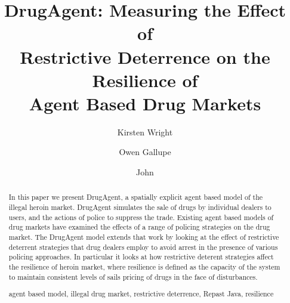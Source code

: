 \documentclass[runningheads,a4paper]{llncs}
\newcommand{\keywords}[1]{\par\addvspace\baselineskip
\noindent\keywordname\enspace\ignorespaces#1}
\begin{document}
\mainmatter  %

\title{DrugAgent: Measuring the Effect of \\Restrictive Deterrence on the Resilience of \\Agent Based Drug Markets}
%
%
\author{Kirsten Wright %
\and Owen Gallupe \and John}
%




\maketitle


\begin{abstract}

In this paper we present DrugAgent, a spatially explicit agent based model of the illegal heroin market. DrugAgent simulates the sale of drugs by individual dealers to users, and the actions of police to suppress the trade. Existing agent based models of drug markets have examined the effects of a range of policing strategies on the drug market. The DrugAgent model extends that work by looking at the effect of restrictive deterrent strategies that drug dealers employ to avoid arrest in the presence of various policing approaches. In particular it looks at how restrictive deterent strategies affect the resilience of heroin market, where resilience is defined as the capacity of the system to maintain consistent levels of sails pricing of drugs in the face of disturbances.


\keywords{agent based model, illegal drug market, restrictive deterrence, Repast Java, resilience}
\end{abstract}
\end{document}
